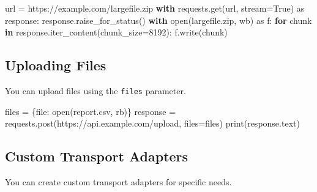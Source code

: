 \documentclass[
  letterpaper,
  DIV=11,
  numbers=noendperiod]{scrreprt}
\newenvironment{Shaded}{\begin{snugshade}}{\end{snugshade}}
\newcommand{\BuiltInTok}[1]{\textcolor[rgb]{0.00,0.23,0.31}{#1}}
\newcommand{\ControlFlowTok}[1]{\textcolor[rgb]{0.00,0.23,0.31}{\textbf{#1}}}
\newcommand{\DecValTok}[1]{\textcolor[rgb]{0.68,0.00,0.00}{#1}}
\newcommand{\ImportTok}[1]{\textcolor[rgb]{0.00,0.46,0.62}{#1}}
\newcommand{\KeywordTok}[1]{\textcolor[rgb]{0.00,0.23,0.31}{\textbf{#1}}}
\newcommand{\NormalTok}[1]{\textcolor[rgb]{0.00,0.23,0.31}{#1}}
\newcommand{\OperatorTok}[1]{\textcolor[rgb]{0.37,0.37,0.37}{#1}}
\newcommand{\StringTok}[1]{\textcolor[rgb]{0.13,0.47,0.30}{#1}}
\newcommand{\VariableTok}[1]{\textcolor[rgb]{0.07,0.07,0.07}{#1}}
\begin{document}
\begin{Shaded}
\begin{Highlighting}[]
\NormalTok{url }\OperatorTok{=} \StringTok{\textquotesingle{}https://example.com/largefile.zip\textquotesingle{}}
\ControlFlowTok{with}\NormalTok{ requests.get(url, stream}\OperatorTok{=}\VariableTok{True}\NormalTok{) }\ImportTok{as}\NormalTok{ response:}
\NormalTok{    response.raise\_for\_status()}
    \ControlFlowTok{with} \BuiltInTok{open}\NormalTok{(}\StringTok{\textquotesingle{}largefile.zip\textquotesingle{}}\NormalTok{, }\StringTok{\textquotesingle{}wb\textquotesingle{}}\NormalTok{) }\ImportTok{as}\NormalTok{ f:}
        \ControlFlowTok{for}\NormalTok{ chunk }\KeywordTok{in}\NormalTok{ response.iter\_content(chunk\_size}\OperatorTok{=}\DecValTok{8192}\NormalTok{):}
\NormalTok{            f.write(chunk)}
\end{Highlighting}
\end{Shaded}

\subsection{Uploading Files}\label{uploading-files}

You can upload files using the \texttt{files} parameter.

\begin{Shaded}
\begin{Highlighting}[]
\NormalTok{files }\OperatorTok{=}\NormalTok{ \{}\StringTok{\textquotesingle{}file\textquotesingle{}}\NormalTok{: }\BuiltInTok{open}\NormalTok{(}\StringTok{\textquotesingle{}report.csv\textquotesingle{}}\NormalTok{, }\StringTok{\textquotesingle{}rb\textquotesingle{}}\NormalTok{)\}}
\NormalTok{response }\OperatorTok{=}\NormalTok{ requests.post(}\StringTok{\textquotesingle{}https://api.example.com/upload\textquotesingle{}}\NormalTok{, files}\OperatorTok{=}\NormalTok{files)}
\BuiltInTok{print}\NormalTok{(response.text)}
\end{Highlighting}
\end{Shaded}

\subsection{Custom Transport Adapters}\label{custom-transport-adapters}

You can create custom transport adapters for specific needs.
\end{document}
